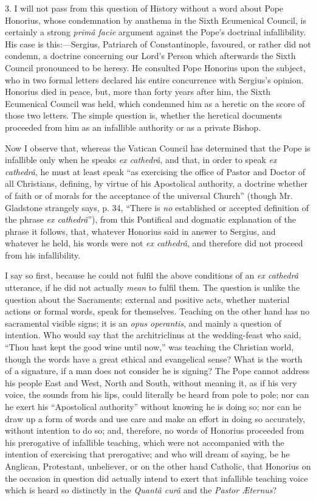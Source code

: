 3. I will not pass from this question of History without a word about
Pope Honorius, whose condemnation by anathema in the Sixth Ecumenical
Council, is certainly a strong \emph{primâ facie} argument against the
Pope's doctrinal infallibility. His case is this:—Sergius, Patriarch
of Constantinople, favoured, or rather did not condemn, a doctrine
concerning our Lord's Person which afterwards the Sixth Council
pronounced to be heresy. He consulted Pope Honorius upon the subject,
who in two formal letters declared his entire concurrence with Sergius's
opinion. Honorius died in peace, but, more than forty years after him,
the Sixth Ecumenical Council was held, which condemned him as a heretic
on the score of those two letters. The simple question is, whether the
heretical documents proceeded from him as an infallible authority or as
a private Bishop.

Now I observe that, whereas the Vatican Council has determined that
the Pope is infallible only when he speaks \emph{ex cathedrâ}, and
that, in order to speak \emph{ex cathedrâ}, he must at least speak
``as exercising the office of Pastor and Doctor of all Christians,
defining, by virtue of his Apostolical authority, a doctrine whether of
faith or of morals for the acceptance of the universal Church''
(though Mr. Gladstone strangely says, p. 34, ``There is \emph{no}
established or accepted definition of the phrase \emph{ex cathedrâ}''),
from this Pontifical and dogmatic explanation of the phrase it follows,
that, whatever Honorius said in answer to Sergius, and whatever he held,
his words were not \emph{ex cathedrâ}, and therefore did not proceed
from his infallibility.

I say so first, because he could not fulfil the above conditions of
an \emph{ex cathedrâ} utterance, if he did not actually \emph{mean} to
fulfil them. The question is unlike the question about the Sacraments;
external and positive acts, whether material actions or formal words,
speak for themselves. Teaching on the other hand has no sacramental
visible signs; it is an \emph{opus operantis}, and mainly a question of
intention. Who would say that the architriclinus at the wedding-feast
who said, ``Thou hast kept the good wine until now,'' was
teaching the Christian world, though the words have a great ethical and
evangelical sense? What is the worth of a signature, if a man does not
consider he is signing? The Pope cannot address his people East and
West, North and South, without meaning it, as if his very voice, the
sounds from his lips, could literally be heard from pole to pole; nor
can he exert his ``Apostolical authority'' without knowing he is
doing so; nor can he draw up a form of words and use care and make an
effort in doing so accurately, without intention to do so; and,
therefore, no words of Honorius proceeded from his prerogative of
infallible teaching, which were not accompanied with the intention of
exercising that prerogative; and who will dream of saying, be he
Anglican, Protestant, unbeliever, or on the other hand Catholic,
that Honorius on the occasion in question did actually intend to exert
that infallible teaching voice which is heard so distinctly in the \emph{Quantâ
curâ} and the \emph{Pastor Æternus}?

